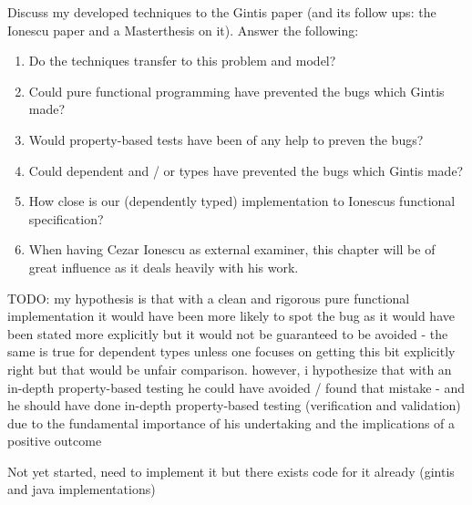 Discuss my developed techniques to the Gintis paper (and its follow ups: the Ionescu paper \cite{botta_functional_2011} and a Masterthesis \cite{evensen_extensible_2010} on it). Answer the following:

\begin{enumerate}
	\item Do the techniques transfer to this problem and model? 
	
	\item Could pure functional programming have prevented the bugs which Gintis made? 
	
	\item Would property-based tests have been of any help to preven the bugs?
	
	\item Could dependent and / or types have prevented the bugs which Gintis made? 
	
	\item How close is our (dependently typed) implementation to Ionescus functional specification? 
	
	\item When having Cezar Ionescu as external examiner, this chapter will be of great influence as it deals heavily with his work.

\end{enumerate}

TODO: my hypothesis is that with a clean and rigorous pure functional implementation it would have been more likely to spot the bug as it would have been stated more explicitly but it would not be guaranteed to be avoided - the same is true for dependent types unless one focuses on getting this bit explicitly right but that would be unfair comparison. however, i hypothesize that with an in-depth property-based testing he could have avoided / found that mistake - and he should have done in-depth property-based testing (verification and validation) due to the fundamental importance of his undertaking and the implications of a positive outcome

Not yet started, need to implement it but there exists code for it already (gintis and java implementations)

%
%
%
%

